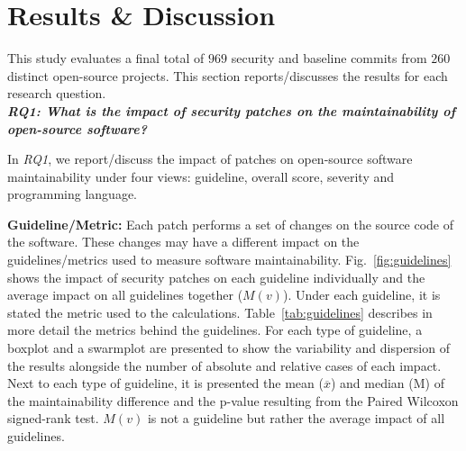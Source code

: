 \documentclass[smallextended]{svjour3}       %
\begin{document}
\section{Results \& Discussion}\label{sec:results}

This study evaluates a final total of $969$ security and baseline commits 
from $260$ distinct open-source projects. This section reports/discusses 
the results for each research question.
%
\\\textit{\textbf{RQ1: What is the impact of security patches on the
maintainability of open-source software?}}

In \emph{RQ1}, we report/discuss the impact of patches on open-source
software maintainability under four views: guideline, overall score, 
severity and programming language.

\textbf{Guideline/Metric:} Each patch performs a set of changes
on the source code of the software. These changes may have a different
impact on the guidelines/metrics used to measure software maintainability. 
Fig.~\ref{fig:guidelines} shows the impact of security patches 
on each guideline individually and the average impact on all guidelines 
together ($M(v)$). Under each guideline, it is stated the 
metric used to the calculations. Table~\ref{tab:guidelines} describes 
in more detail the metrics behind the guidelines. 
For each type of guideline, a boxplot 
and a swarmplot are presented to show the variability and dispersion of
the results alongside the number of absolute
and relative cases of each impact. Next to each
type of guideline, it is presented the mean ($\overline{x}$) and median (M)
of the maintainability difference and the p-value resulting from the
Paired Wilcoxon signed-rank test. $M(v)$ is not a guideline but rather the 
average impact of all guidelines.
\end{document}
